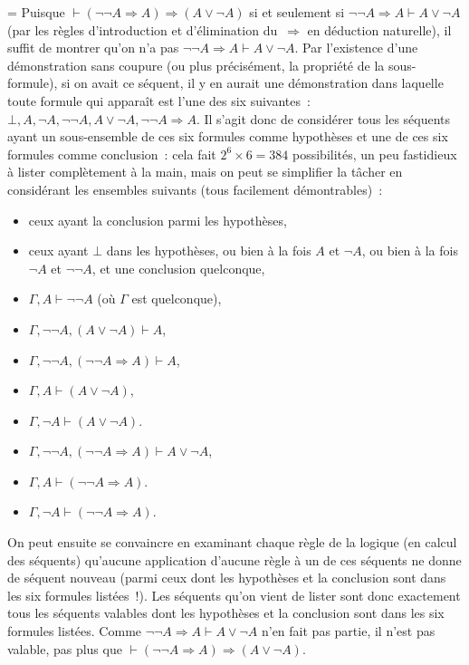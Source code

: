 \documentclass[12pt,a4paper]{article}
\theoremstyle{definition}
\newif\ifcorrige
\newenvironment{corrige}%
{\ifcorrige\relax\else\setbox0=\vbox\bgroup\fi%
\smallbreak\footnotesize\noindent{\underbar{\textit{Corrigé.}}\quad}}
{{\hbox{}\nobreak\hfill\checkmark}%
\ifcorrige\relax\else\egroup\fi\par}
\begin{document}
\begin{corrige}
Puisque $\vdash (\neg\neg A \Rightarrow A) \Rightarrow (A \lor \neg
A)$ si et seulement si $\neg\neg A \Rightarrow A \vdash A \lor \neg A$
(par les règles d'introduction et d'élimination du $\Rightarrow$ en
déduction naturelle), il suffit de montrer qu'on n'a pas $\neg\neg A
\Rightarrow A \vdash A \lor \neg A$.  Par l'existence d'une
démonstration sans coupure (ou plus précisément, la propriété de la
sous-formule), si on avait ce séquent, il y en aurait une
démonstration dans laquelle toute formule qui apparaît est l'une des
six suivantes : $\bot, A, \neg A, \neg\neg A, A\lor\neg A, \neg\neg A
\Rightarrow A$.  Il s'agit donc de considérer tous les séquents ayant
un sous-ensemble de ces six formules comme hypothèses et une de ces
six formules comme conclusion : cela fait $2^6\times 6 = 384$
possibilités, un peu fastidieux à lister complètement à la main, mais
on peut se simplifier la tâcher en considérant les ensembles suivants
(tous facilement démontrables) :
\begin{itemize}
\item ceux ayant la conclusion parmi les hypothèses,
\item ceux ayant $\bot$ dans les hypothèses, ou bien à la fois $A$ et
  $\neg A$, ou bien à la fois $\neg A$ et $\neg\neg A$, et une
  conclusion quelconque,
\item $\Gamma, A \vdash \neg\neg A$ (où $\Gamma$ est quelconque),
\item $\Gamma, \neg\neg A, (A\lor\neg A) \vdash A$,
\item $\Gamma, \neg\neg A, (\neg\neg A \Rightarrow A) \vdash A$,
\item $\Gamma, A \vdash (A\lor\neg A)$,
\item $\Gamma, \neg A \vdash (A\lor\neg A)$.
\item $\Gamma, \neg\neg A, (\neg\neg A \Rightarrow A) \vdash A\lor\neg
  A$,
\item $\Gamma, A \vdash (\neg\neg A \Rightarrow A)$.
\item $\Gamma, \neg A \vdash (\neg\neg A \Rightarrow A)$.
\end{itemize}
On peut ensuite se convaincre en examinant chaque règle de la logique
(en calcul des séquents) qu'aucune application d'aucune règle à un de
ces séquents ne donne de séquent nouveau (parmi ceux dont les
hypothèses et la conclusion sont dans les six formules listées !).
Les séquents qu'on vient de lister sont donc exactement tous les
séquents valables dont les hypothèses et la conclusion sont dans les
six formules listées.  Comme $\neg\neg A \Rightarrow A \vdash A \lor
\neg A$ n'en fait pas partie, il n'est pas valable, pas plus que
$\vdash (\neg\neg A \Rightarrow A) \Rightarrow (A \lor \neg A)$.


\end{corrige}
\end{document}
